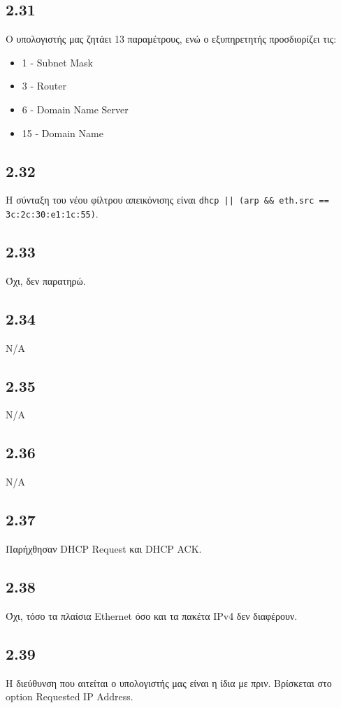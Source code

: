 		\subsection*{2.31}
			Ο υπολογιστής μας ζητάει 13 παραμέτρους, ενώ ο εξυπηρετητής προσδιορίζει τις:
			
			\begin{itemize}
				\item 1 - Subnet Mask
				\item 3 - Router 
				\item 6 - Domain Name Server
				\item 15 - Domain Name
			\end{itemize} 

		\subsection*{2.32}
			Η σύνταξη του νέου φίλτρου απεικόνισης είναι \verb+dhcp || (arp && eth.src == 3c:2c:30:e1:1c:55)+.

		\subsection*{2.33}
			Όχι, δεν παρατηρώ.		

		\subsection*{2.34}
			N/A

		\subsection*{2.35}
			N/A

		\subsection*{2.36}
			N/A

		\subsection*{2.37}
			Παρήχθησαν DHCP Request και DHCP ACK.

		\subsection*{2.38}
			Όχι, τόσο τα πλαίσια Ethernet όσο και τα πακέτα IPv4 δεν διαφέρουν. 

		\subsection*{2.39}
			Η διεύθυνση που αιτείται ο υπολογιστής μας είναι η ίδια με πριν. Βρίσκεται στο option Requested IP Address.

